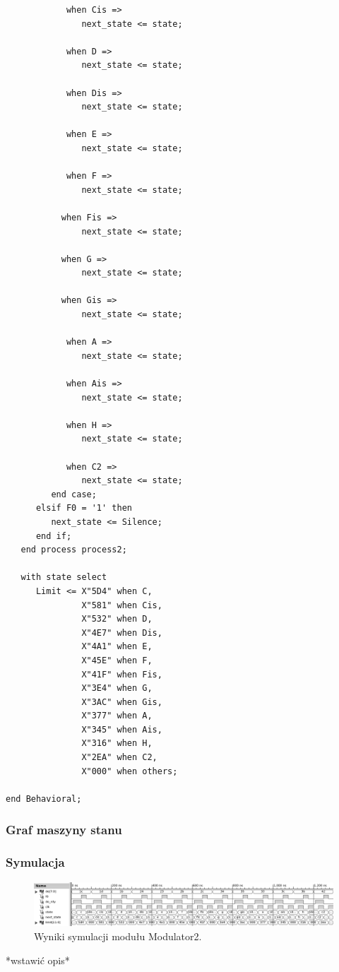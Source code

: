 \documentclass[a4paper,11pt]{article}
\begin{document}
\begin{lstlisting}
            when Cis =>
               next_state <= state;
               
            when D =>
               next_state <= state;
               
            when Dis =>
               next_state <= state;
            
            when E =>
               next_state <= state;
               
            when F =>
               next_state <= state;
               
           when Fis =>
               next_state <= state;
               
           when G =>
               next_state <= state;
           
           when Gis =>
               next_state <= state;
               
            when A =>
               next_state <= state;
               
            when Ais =>
               next_state <= state;
               
            when H =>
               next_state <= state;
               
            when C2 =>
               next_state <= state;
         end case;
      elsif F0 = '1' then
         next_state <= Silence;
      end if;
   end process process2;
   
   with state select
      Limit <= X"5D4" when C,
               X"581" when Cis,
               X"532" when D,
               X"4E7" when Dis,
               X"4A1" when E,
               X"45E" when F,
               X"41F" when Fis,
               X"3E4" when G,
               X"3AC" when Gis,
               X"377" when A,
               X"345" when Ais,
               X"316" when H,
               X"2EA" when C2,
               X"000" when others;

end Behavioral;
\end{lstlisting}
\subsubsection*{Graf maszyny stanu}

\subsubsection*{Symulacja}
\begin{figure}[H]
\center
\includegraphics[scale=0.6]{modulatorsymbw.png}
\caption{Wyniki symulacji modułu Modulator2.}
\end{figure}
*wstawić opis*
\end{document}
